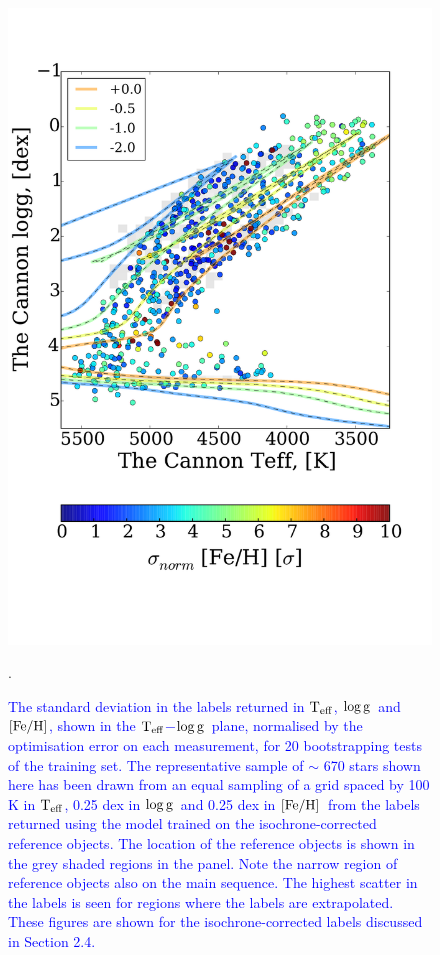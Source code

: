 \documentclass[12pt, preprint]{aastex}
\newcommand{\teff}{\mbox{$\rm T_{eff}$}}
\newcommand{\feh}{\mbox{$\rm [Fe/H]$}}
\newcommand{\logg}{\mbox{$\rm \log g$}}
\begin{document}
\begin{figure}[!h]
    \includegraphics[scale=0.26]{./plots/aftersubmit/stdtest_feh_normed.pdf}
    \caption{\textcolor{blue}{The standard deviation in the labels returned in \teff, \logg\ and \feh, shown in the \teff$-$\logg\ plane, normalised by the optimisation error on each measurement, for 20 bootstrapping tests of the training set. The representative sample of $\sim$ 670 stars shown here has been drawn from an equal sampling of a grid spaced by 100 K in \teff, 0.25 dex in \logg\ and 0.25 dex in \feh\ from the labels returned using the model trained on the isochrone-corrected reference objects. The location of the reference objects is shown in the grey shaded regions in the panel. Note the narrow region of reference objects also on the main sequence. The highest scatter in the labels is seen for regions where the labels are extrapolated. These figures are shown for the isochrone-corrected labels discussed in Section 2.4.}}
    \label{fig:sigma}.
\end{figure}
\end{document}

